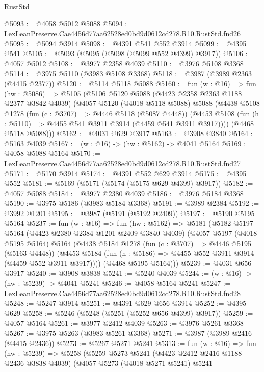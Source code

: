 \begin{lexlean}{RustStd}
\begin{coremodule}
@5093 := @4058 @5012 @5088
@5094 := LexLeanPreserve.Cae4456d77aa62528ed0bd9d0612cd278.R10.RustStd.fnd26
@5095 := @5094 @3914
@5098 := @4391 @541 @552 @3914
@5099 := @4395 @541
@5105 := @5093 (@5095 (@5098 (@5099 @552 @4399) @3917))
@5106 := @4057 @5012
@5108 := @3977 @2358 @4039
@5110 := @3976 @5108 @3368
@5114 := @3975 @5110 (@3983 @5108 @3368)
@5118 := @3987 (@3989 @2363 (@4415 @2377))
@5120 := @5114 @5118 @5088
@5160 := fun (w : @16) =>
  fun (hw : @5086) =>
  @5105
    (@5106
      @5120
      @5088
      (@4423 @2358 @2363 @1188 @2377 @3842 @4039)
      (@4057
        @5120
        (@4018 @5118 @5088)
        @5088
        (@4438
          @5108
          @1278
          (fun (c : @3707) => @4446 @5118 (@5087 @4448))
          (@4453 @5108 (fun (h : @5110) => @4455 @541 @3911 @3914 (@4459 @541 @3911 @3917))))
        (@4468 @5118 @5088)))
@5162 := @4031 @629 @3917
@5163 := @3908 @3840
@5164 := @5163 @4039
@5167 := (w : @16) -> (hw : @5162) -> @4041 @5164
@5169 := @4058 @5088 @5164
@5170 := LexLeanPreserve.Cae4456d77aa62528ed0bd9d0612cd278.R10.RustStd.fnd27
@5171 := @5170 @3914
@5174 := @4391 @552 @629 @3914
@5175 := @4395 @552
@5181 := @5169 (@5171 (@5174 (@5175 @629 @4399) @3917))
@5182 := @4057 @5088
@5184 := @3977 @2380 @4039
@5186 := @3976 @5184 @3368
@5190 := @3975 @5186 (@3983 @5184 @3368)
@5191 := @3989 @2384
@5192 := @3992 @1201
@5195 := @3987 (@5191 (@5192 @2409))
@5197 := @5190 @5195 @5164
@5237 := fun (w : @16) =>
  fun (hw : @5162) =>
  @5181
    (@5182
      @5197
      @5164
      (@4423 @2380 @2384 @1201 @2409 @3840 @4039)
      (@4057
        @5197
        (@4018 @5195 @5164)
        @5164
        (@4438
          @5184
          @1278
          (fun (c : @3707) => @4446 @5195 (@5163 @4448))
          (@4453 @5184 (fun (h : @5186) => @4455 @552 @3911 @3914 (@4459 @552 @3911 @3917))))
        (@4468 @5195 @5164)))
@5239 := @4031 @656 @3917
@5240 := @3908 @3838
@5241 := @5240 @4039
@5244 := (w : @16) -> (hw : @5239) -> @4041 @5241
@5246 := @4058 @5164 @5241
@5247 := LexLeanPreserve.Cae4456d77aa62528ed0bd9d0612cd278.R10.RustStd.fnd28
@5248 := @5247 @3914
@5251 := @4391 @629 @656 @3914
@5252 := @4395 @629
@5258 := @5246 (@5248 (@5251 (@5252 @656 @4399) @3917))
@5259 := @4057 @5164
@5261 := @3977 @2412 @4039
@5263 := @3976 @5261 @3368
@5267 := @3975 @5263 (@3983 @5261 @3368)
@5271 := @3987 (@3989 @2416 (@4415 @2436))
@5273 := @5267 @5271 @5241
@5313 := fun (w : @16) =>
  fun (hw : @5239) =>
  @5258
    (@5259
      @5273
      @5241
      (@4423 @2412 @2416 @1188 @2436 @3838 @4039)
      (@4057
        @5273
        (@4018 @5271 @5241)
        @5241

\end{coremodule}
\end{lexlean}
